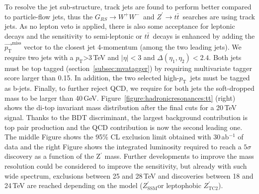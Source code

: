 \documentclass[a4paper,11pt]{article}
\newcommand{\ZpSSM}{\ensuremath{Z^{\prime}_{\mathrm{SSM}}}}
\newcommand{\ZpTC}{\ensuremath{Z^{\prime}_{\mathrm{TC2}}}}
\newcommand*{\Zptt}{\ensuremath{Z^{\prime} \rightarrow \ttbar}}
\newcommand{\pt}{\ensuremath{p_{\text{T}}}}
\newcommand*{\rsg}{\ensuremath{G_{RS} \rightarrow W^+W^-}}
\newcommand*{\metvec}{\vec{\pt}^{\textrm{miss}}}
\newcommand*{\ttbar}{\ensuremath{t\bar{t}}}
\begin{document}
To resolve the jet sub-structure, track jets are found to perform better compared to particle-flow jets, thus the \rsg\ and \Zptt\ searches are using track jets. As no lepton veto is applied, there is also some acceptance for leptonic decays and the sensitivity to semi-leptonic or \ttbar\ decays is enhanced by adding the $\metvec$ vector to the closest jet 4-momentum (among the two leading jets).
We require two jets with a $\pt$>3\,TeV and $|\eta|<3$ and $\Delta(\eta_1,\eta_2)<2.4$. Both jets must be top tagged (section~\ref{subsec:mvatagger}) by requiring multivariate tagger score larger than 0.15. In addition, the two selected high-\pt\ jets must be tagged as b-jets. Finally, to further reject QCD, we require for both jets the soft-dropped mass to be larger than 40\,GeV. Figure~\ref{figure:hadronicresonances:tt} (right) shows the di-top invariant mass distribution after the final cuts for a 20\,TeV signal. Thanks to the BDT discriminant, the largest background contribution is top pair production and the QCD contribution is now the second leading one. The middle Figure shows the 95\% CL exclusion limit obtained with 30\,ab$^{-1}$ of data and the right Figure shows the integrated luminosity required to reach a $5\sigma$ discovery as a function of the Z$^\prime$ mass. Further developments to improve the mass resolution could be considered to improve the sensitivity, but already with such wide spectrum, exclusions between 25 and 28\,TeV and discoveries between 18 and 24\,TeV are reached depending on the model (\ZpSSM or leptophobic \ZpTC).
\end{document}
